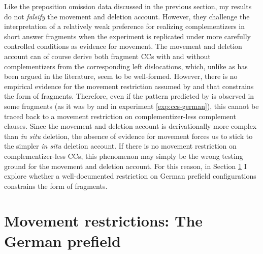 Like the preposition omission data discussed in the previous section, my results do not \textit{falsify} the movement and deletion account. However, they challenge the interpretation of a relatively weak preference for realizing complementizers in short answer fragments when the experiment is replicated under more carefully controlled conditions as evidence for movement. The movement and deletion account can of course derive both fragment CCs with and without complementizers from the corresponding left dislocations, which, unlike as has been argued in the literature, seem to be well-formed. However, there is no empirical evidence for the movement restriction assumed by \citet{merchant2004} and \citet{merchant.etal2013} that constrains the form of fragments. Therefore, even if the pattern predicted by \citet{merchant2004} is observed in some fragments (as it was by \citet{merchant.etal2013} and in experiment \ref{exp:ccs-german}), this cannot be traced back to a movement restriction on complementizer-less complement clauses. Since the movement and deletion account is derivationally more complex than \textit{in situ} deletion, the absence of evidence for movement forces us to stick to the simpler \textit{in situ} deletion account. If there is no movement restriction on complementizer-less CCs, this phenomenon may simply be the wrong testing ground for the movement and deletion account. For this reason, in Section \ref{sec:mvb} I explore whether a well-documented restriction on German prefield configurations constrains the form of fragments.

\section{Movement restrictions: The German prefield}\label{sec:mvb}
